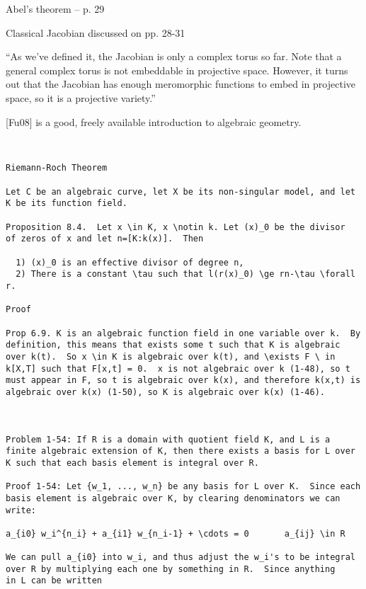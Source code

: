 \vfill\eject
{}

Abel's theorem -- p. 29

Classical Jacobian discussed on pp. 28-31

``As we’ve defined it, the Jacobian is only a complex torus so far. Note that a
general complex torus is not embeddable in projective space. However, it turns
out that the Jacobian has enough meromorphic functions to embed in projective
space, so it is a projective variety.''


\vfill\eject
{}

[Fu08] is a good, freely available introduction to algebraic geometry.

{\small\begin{verbatim}


Riemann-Roch Theorem

Let C be an algebraic curve, let X be its non-singular model, and let
K be its function field.

Proposition 8.4.  Let x \in K, x \notin k. Let (x)_0 be the divisor
of zeros of x and let n=[K:k(x)].  Then

  1) (x)_0 is an effective divisor of degree n,
  2) There is a constant \tau such that l(r(x)_0) \ge rn-\tau \forall r.

Proof

Prop 6.9. K is an algebraic function field in one variable over k.  By
definition, this means that exists some t such that K is algebraic
over k(t).  So x \in K is algebraic over k(t), and \exists F \ in
k[X,T] such that F[x,t] = 0.  x is not algebraic over k (1-48), so t
must appear in F, so t is algebraic over k(x), and therefore k(x,t) is
algebraic over k(x) (1-50), so K is algebraic over k(x) (1-46).



Problem 1-54: If R is a domain with quotient field K, and L is a
finite algebraic extension of K, then there exists a basis for L over
K such that each basis element is integral over R.

Proof 1-54: Let {w_1, ..., w_n} be any basis for L over K.  Since each
basis element is algebraic over K, by clearing denominators we can
write:

a_{i0} w_i^{n_i} + a_{i1} w_{n_i-1} + \cdots = 0       a_{ij} \in R

We can pull a_{i0} into w_i, and thus adjust the w_i's to be integral
over R by multiplying each one by something in R.  Since anything
in L can be written


\end{verbatim}}
